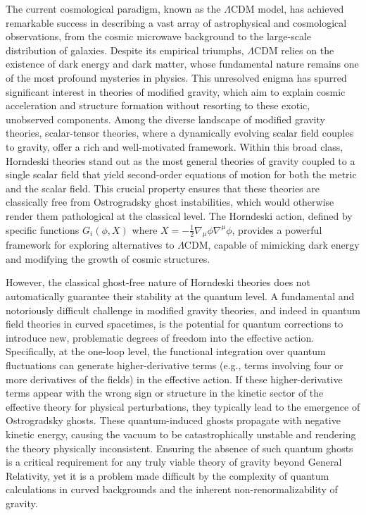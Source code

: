 \documentclass[twocolumn]{aastex631}
\begin{document}
The current cosmological paradigm, known as the $\Lambda$CDM model, has achieved remarkable success in describing a vast array of astrophysical and cosmological observations, from the cosmic microwave background to the large-scale distribution of galaxies. Despite its empirical triumphs, $\Lambda$CDM relies on the existence of dark energy and dark matter, whose fundamental nature remains one of the most profound mysteries in physics. This unresolved enigma has spurred significant interest in theories of modified gravity, which aim to explain cosmic acceleration and structure formation without resorting to these exotic, unobserved components. Among the diverse landscape of modified gravity theories, scalar-tensor theories, where a dynamically evolving scalar field couples to gravity, offer a rich and well-motivated framework. Within this broad class, Horndeski theories stand out as the most general theories of gravity coupled to a single scalar field that yield second-order equations of motion for both the metric and the scalar field. This crucial property ensures that these theories are classically free from Ostrogradsky ghost instabilities, which would otherwise render them pathological at the classical level. The Horndeski action, defined by specific functions $G_i(\phi, X)$ where $X = -\frac{1}{2}\nabla_\mu\phi \nabla^\mu\phi$, provides a powerful framework for exploring alternatives to $\Lambda$CDM, capable of mimicking dark energy and modifying the growth of cosmic structures.

However, the classical ghost-free nature of Horndeski theories does not automatically guarantee their stability at the quantum level. A fundamental and notoriously difficult challenge in modified gravity theories, and indeed in quantum field theories in curved spacetimes, is the potential for quantum corrections to introduce new, problematic degrees of freedom into the effective action. Specifically, at the one-loop level, the functional integration over quantum fluctuations can generate higher-derivative terms (e.g., terms involving four or more derivatives of the fields) in the effective action. If these higher-derivative terms appear with the wrong sign or structure in the kinetic sector of the effective theory for physical perturbations, they typically lead to the emergence of Ostrogradsky ghosts. These quantum-induced ghosts propagate with negative kinetic energy, causing the vacuum to be catastrophically unstable and rendering the theory physically inconsistent. Ensuring the absence of such quantum ghosts is a critical requirement for any truly viable theory of gravity beyond General Relativity, yet it is a problem made difficult by the complexity of quantum calculations in curved backgrounds and the inherent non-renormalizability of gravity.
\end{document}
